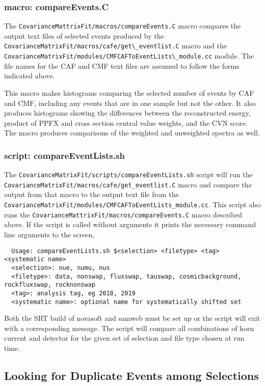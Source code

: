 \subsubsection{macro: compareEvents.C}

The \lstinline{CovarianceMattrixFit/macros/compareEvents.C} macro compares the output text files of selected events produced by the \lstinline{CovarianceMatrixFit/macros/cafe/get\_eventlist.C} macro and the \lstinline{CovarianceMatrixFit/modules/CMFCAFToEventLists\_module.cc} module. The file names for the CAF and CMF text files are assumed to follow the forms indicated above.

This macro makes histograms comparing the selected number of events by CAF and CMF, including any events that are in one sample but not the other.  It also produces histograms showing the differences between the reconstructed energy, product of PPFX and cross section central value weights, and the CVN score.  The macro produces comparisons of the weighted and unweighted spectra as well.

\subsubsection{script: compareEventLists.sh}

The \lstinline{CovarianceMatrixFit/scripts/compareEventLists.sh} script will run the \lstinline{CovarianceMatrixFit/macros/cafe/get_eventlist.C} macro and compare the output from that macro to the output text file from the \lstinline{CovarianceMatrixFit/modules/CMFCAFToEventLists_module.cc}.  This script also runs the \lstinline{CovarianceMattrixFit/macros/compareEvents.C} macro described above. If the script is called without arguments it prints the necessary command line arguments to the screen,
\begin{lstlisting}
  Usage: compareEventLists.sh $<selection> <filetype> <tag> <systematic name>
  <selection>: nue, numu, nus
  <filetype>: data, nonswap, fluxswap, tauswap, cosmicbackground, rockfluxswap, rocknonswap
  <tag>: analysis tag, eg 2018, 2019
  <systematic name>: optional name for systematically shifted set
\end{lstlisting}
Both the SRT build of novasoft and samweb must be set up or the script will exit with a corresponding message. The script will compare all combinations of horn current and detector for the given set of selection and file  type chosen at run time.

\subsection{Looking for Duplicate Events among Selections}

